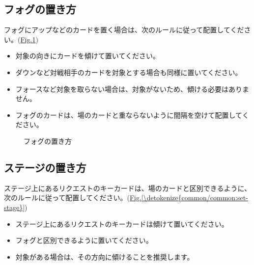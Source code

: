 \documentclass[letterpaper,10pt,dvipdfmx]{sphinxmanual}
\begin{document}
\subsection{フォグの置き方}
\label{\detokenize{common/common:id44}}
\sphinxAtStartPar
フォグにアップなどのカードを置く場合は、次のルールに従って配置してください。(\hyperref[\detokenize{common/common:set-fog}]{Fig.\@ \ref{\detokenize{common/common:set-fog}}})
\begin{itemize}
\item {} 
\sphinxAtStartPar
対象の向きにカードを傾けて置いてください。

\item {} 
\sphinxAtStartPar
ダウンなど対戦相手のカードを対象とする場合も同様に置いてください。

\item {} 
\sphinxAtStartPar
フォースなど対象を取らない場合は、対象がないため、傾ける必要はありません。

\item {} 
\sphinxAtStartPar
フォグのカードは、場のカードと重ならないように間隔を空けて配置してください。

\end{itemize}

\begin{figure}[htbp]
\centering
\capstart

\noindent{}
\caption{フォグの置き方}\label{\detokenize{common/common:id55}}\label{\detokenize{common/common:set-fog}}\end{figure}


\subsection{ステージの置き方}
\label{\detokenize{common/common:id45}}
\sphinxAtStartPar
ステージ上にあるリクエストのキーカードは、場のカードと区別できるように、次のルールに従って配置してください。(\hyperref[\detokenize{common/common:set-stage}]{Fig.\@ \ref{\detokenize{common/common:set-stage}}})
\begin{itemize}
\item {} 
\sphinxAtStartPar
ステージ上にあるリクエストのキーカードは傾けて置いてください。

\item {} 
\sphinxAtStartPar
フォグと区別できるように置いてください。

\item {} 
\sphinxAtStartPar
対象がある場合は、その方向に傾けることを推奨します。

\end{itemize}
\end{document}
